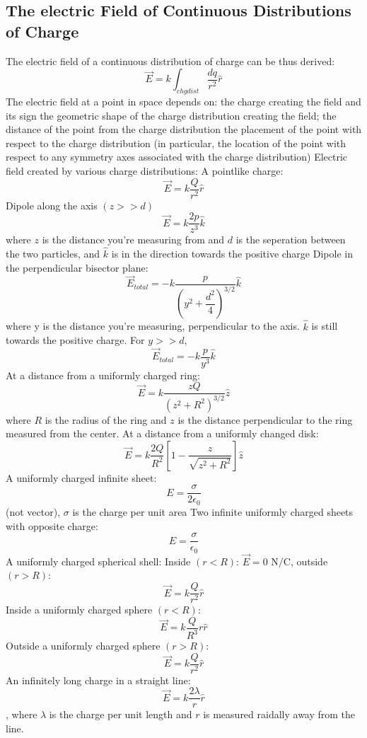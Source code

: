 \documentclass[twocolumn]{article}
\begin{document}
\subsection{The electric Field of Continuous Distributions of Charge}
\begin{outline}
	\1 The electric field of a continuous distribution of charge can be thus derived: \[\vec{E}=k\int_{chg dist}\dfrac{dq}{r^2}\hat r\]
	\1 The electric field at a point in space depends on: 
		\2 the charge creating the field and its sign 
		\2 the geometric shape of the charge distribution creating the field;
		\2 the distance of the point from the charge distribution
		\2 the placement of the point with respect to the charge distribution (in particular, the location of the point with respect to any symmetry axes associated with the charge distribution)
	\1 Electric field created by various charge distributions: 
		\2 A pointlike charge: \[\vec{E}=k\dfrac{Q}{r^2}\hat r\]
		\2 Dipole along the axis \((z>>d)\) \[\vec{E}=k\dfrac{2p}{z^3}\hat k\] where $z$ is the distance you're measuring from and $d$ is the seperation between the two particles, and $\hat k$ is in the direction towards the positive charge 
		\2 Dipole in the perpendicular bisector plane: \[\vec{E}_{total}=-k\dfrac{p}{\left(y^2+\dfrac{d^2}{4}\right)^{3/2}}\hat k\] where y is the distance you're measuring, perpendicular to the axis. $\hat k$ is still towards the positive charge. For \(y>>d\), \[\vec{E}_{total}=-k\dfrac{p}{y^3}\hat k\]
		\2 At a distance from a uniformly charged ring: \[\vec{E}=k\dfrac{zQ}{(z^2+R^2)^{3/2}}\hat z\] where $R$ is the radius of the ring and $z$ is the distance perpendicular to the ring measured from the center. 
		\2 At a distance from a uniformly changed disk: \[\vec{E}=k\dfrac{2Q}{R^2}\left[1-\dfrac{z}{\sqrt{z^2+R^2}}\right]\hat z\]
		\2 A uniformly charged infinite sheet: \[E=\dfrac{\sigma}{2\epsilon_0}\] (not vector), $\sigma$ is the charge per unit area 
		\2 Two infinite uniformly charged sheets with opposite charge: \[E=\dfrac{\sigma}{\epsilon_0}\]
		\2 A uniformly charged spherical shell: Inside \((r<R)\): \(\vec{E}=0\text{ N/C}\), outside \((r>R)\): \[\vec{E}=k\dfrac{Q}{r^2}\hat r\]
		\2 Inside a uniformly charged sphere \((r<R)\): \[\vec{E}=k\dfrac{Q}{R^3}r\hat r\]
		\2 Outside a uniformly charged sphere \((r>R)\): \[\vec{E}=k\dfrac{Q}{r^2}\hat r\]
		\2 An infinitely long charge in a straight line: \[\vec{E}=k\dfrac{2\lambda}{r}\hat r\], where $\lambda$ is the charge per unit length and $r$ is measured raidally away from the line. 

\end{outline}
\end{document}
